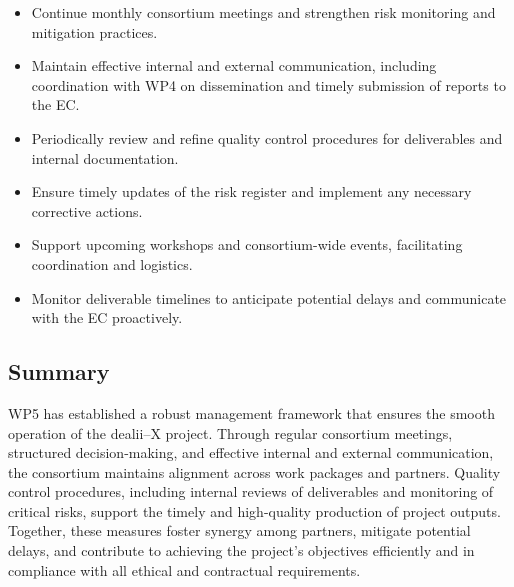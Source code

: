 \documentclass[a4paper,12pt, numbers]{article}
\begin{document}
\begin{itemize}[left=1em, itemsep=0pt, topsep=0pt]
\item Continue monthly consortium meetings and strengthen risk monitoring and mitigation practices.
\item Maintain effective internal and external communication, including coordination with WP4 on dissemination and timely submission of reports to the EC.
\item Periodically review and refine quality control procedures for deliverables and internal documentation.
\item Ensure timely updates of the risk register and implement any necessary corrective actions.
\item Support upcoming workshops and consortium-wide events, facilitating coordination and logistics.
\item Monitor deliverable timelines to anticipate potential delays and communicate with the EC proactively.
\end{itemize}

\subsection{Summary}  

WP5 has established a robust management framework that ensures the smooth operation of the dealii--X project. Through regular consortium meetings, structured decision-making, and effective internal and external communication, the consortium maintains alignment across work packages and partners. Quality control procedures, including internal reviews of deliverables and monitoring of critical risks, support the timely and high-quality production of project outputs. Together, these measures foster synergy among partners, mitigate potential delays, and contribute to achieving the project’s objectives efficiently and in compliance with all ethical and contractual requirements.





\label{MyLastPage}
\end{document}
